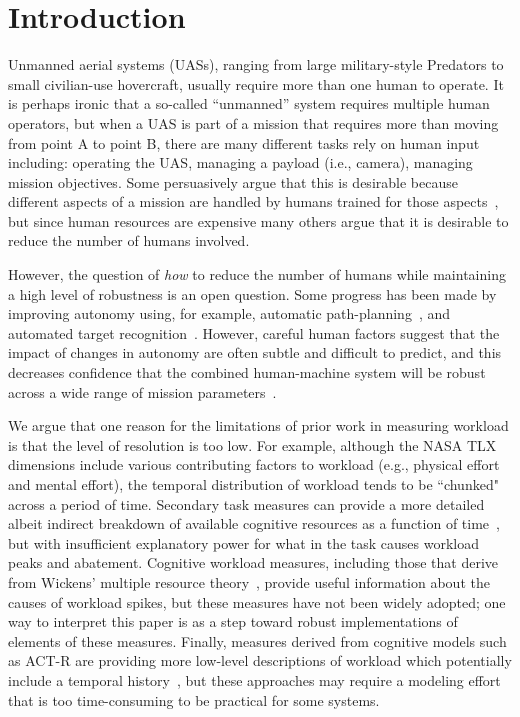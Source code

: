 \section{Introduction}

Unmanned aerial systems (UASs), ranging from large military-style Predators to small civilian-use hovercraft, usually require more than one human to operate.  It is perhaps ironic that a so-called ``unmanned'' system requires multiple human operators, but when a UAS is part of a mission that requires more than moving from point A to point B, there are many different tasks rely on human input including: operating the UAS, managing a payload (i.e., camera), managing mission objectives.  Some persuasively argue that this is desirable because different aspects of a mission are handled by humans trained for those aspects~\cite{MurphyBurke2010}, but since human resources are expensive many others argue that it is desirable to reduce the number of humans involved.

However, the question of {\em how} to reduce the number of humans while maintaining a high level of robustness is an open question.  Some progress has been made by improving autonomy using, for example, automatic path-planning~\cite{WongBourgaultFurukawa2005,878915,pettersson2006probabilistic,QuigleyBarberEtAl2005,NelsonBarberMcLainBeard2006}, and automated target recognition~\cite{MorseEnghGoodrich2010,dasgupta2008multiagent,barber2006vision}.  However, careful human factors suggest that the impact of changes in autonomy are often subtle and difficult to predict, and this decreases confidence that the combined human-machine system will be robust across a wide range of mission parameters~\cite{KaberEndsley2004,chen2011supervisory,chen2007human}.

We argue that one reason for the limitations of prior work in measuring workload is that the level of resolution is too low.  For example, although the NASA TLX dimensions include various contributing factors to workload (e.g., physical effort and mental effort), the temporal distribution of workload tends to be ``chunked" across a period of time.  Secondary task measures can provide a more detailed albeit indirect breakdown of available cognitive resources as a function of time~\cite{kaber1999adaptive}, but with insufficient explanatory power for what in the task causes workload peaks and abatement.  Cognitive workload measures, including those that derive from Wickens' multiple resource theory~\cite{wickens2002multiple}, provide useful information about the causes of workload spikes, but these measures have not been widely adopted; one way to interpret this paper is as a step toward robust implementations of elements of these measures.  Finally, measures derived from cognitive models such as ACT-R are providing more low-level descriptions of workload which potentially include a temporal history~\cite{lebiere2013cognitive}, but these approaches may require a modeling effort that is too time-consuming to be practical for some systems.

